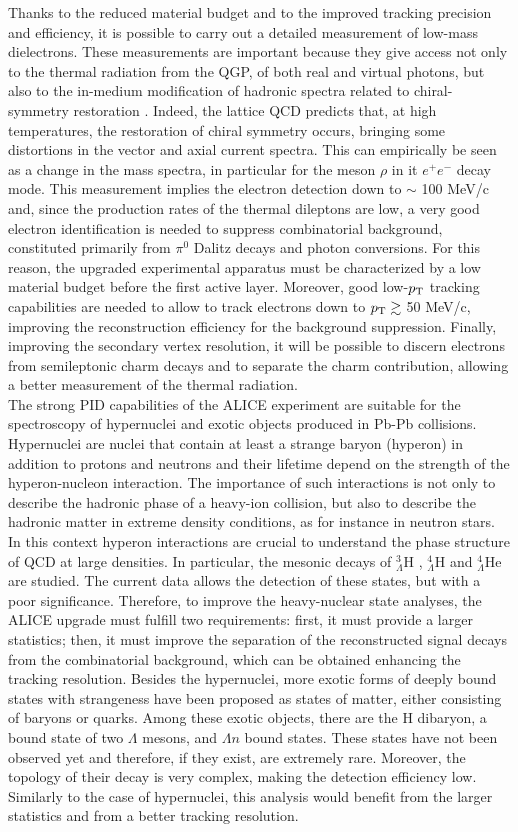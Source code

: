 Thanks to the reduced material budget and to the improved tracking precision and efficiency, it is possible to carry out a detailed measurement of low-mass dielectrons. These measurements are important because they give access not only to the thermal radiation from the QGP, of both real and virtual photons, but also to the in-medium modification of hadronic spectra related to chiral-symmetry restoration \cite{chiral}. Indeed, the lattice QCD predicts that, at high temperatures, the restoration of chiral symmetry occurs, bringing some distortions in the vector and axial current spectra. This can empirically be seen as a change in the mass spectra, in particular for the meson $\rho$ in it $e^+e^-$ decay mode. This measurement implies the electron detection down to $\sim$ 100 MeV/c and, since the production rates of the thermal dileptons are low, a very good electron identification is needed to suppress combinatorial background, constituted primarily from $\pi^0$ Dalitz decays and photon conversions. For this reason, the upgraded experimental apparatus must be characterized by a low material budget before the first active layer. Moreover, good low-$p_\text{T}$ tracking capabilities are needed to allow to track electrons down to $p_\text{T} \gtrsim $ 50 MeV/c, improving the reconstruction efficiency for the background suppression. Finally, improving the secondary vertex resolution, it will be possible to discern electrons from semileptonic charm decays and to separate the charm contribution, allowing a better measurement of the thermal radiation.\\
The strong PID capabilities of the ALICE experiment are suitable for the spectroscopy of hypernuclei and exotic objects produced in Pb-Pb collisions. Hypernuclei are nuclei that contain at least a strange baryon (hyperon) in addition to protons and neutrons and their lifetime depend on the strength of the hyperon-nucleon interaction. The importance of such interactions is not only to describe the hadronic phase of a heavy-ion collision, but also to describe the hadronic matter in extreme density conditions, as for instance in neutron stars. In this context hyperon interactions are crucial to understand the phase structure of QCD at large densities. In particular, the mesonic decays of $^{3}_{\Lambda}$H , $^{4}_{\Lambda}$H  and $^{4}_{\Lambda}$He  are studied. The current data allows the detection of these states, but with a poor significance. Therefore, to improve the heavy-nuclear state analyses, the ALICE upgrade must fulfill two requirements: first, it must provide a larger statistics; then, it must improve the separation of the reconstructed signal decays from the combinatorial background, which can be obtained enhancing the tracking resolution. Besides the hypernuclei, more exotic forms of deeply bound states with strangeness have been proposed as states of matter, either consisting of baryons or quarks. Among these exotic objects, there are the H dibaryon, a bound state of two $\Lambda$ mesons, and $\Lambda n$ bound states. These states have not been observed yet and therefore, if they exist, are extremely rare. Moreover, the topology of their decay is very complex, making the detection efficiency low. Similarly to the case of hypernuclei, this analysis would benefit from the larger statistics and from a better tracking resolution.